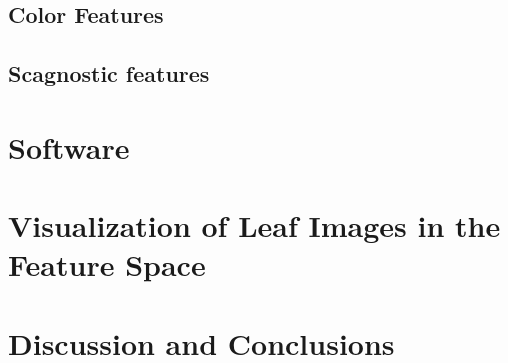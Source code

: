 \documentclass{article}
\begin{document}
\hypertarget{color-features}{%
\subsection{Color Features}\label{color-features}}

\hypertarget{scagnostic-features}{%
\subsection{Scagnostic features}\label{scagnostic-features}}

\hypertarget{software}{%
\section{Software}\label{software}}

\hypertarget{visualization-of-leaf-images-in-the-feature-space}{%
\section{Visualization of Leaf Images in the Feature
Space}\label{visualization-of-leaf-images-in-the-feature-space}}

\hypertarget{discussion-and-conclusions}{%
\section{Discussion and Conclusions}\label{discussion-and-conclusions}}



\end{document}
